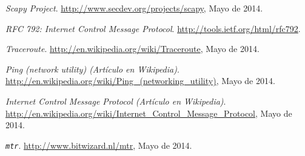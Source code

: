 \documentclass[a4paper, 10pt, twoside]{article}
\begin{document}
\begin{thebibliography}{9}

	\emph{Scapy Project}.
	\url{http://www.secdev.org/projects/scapy}, 
	Mayo de 2014.

  \emph{RFC 792: Internet Control Message Protocol}.
  \url{http://tools.ietf.org/html/rfc792}.

  \emph{Traceroute}.
  \url{http://en.wikipedia.org/wiki/Traceroute},
  Mayo de 2014.

  \emph{Ping (network utility) (Artículo en Wikipedia)}.
  \url{http://en.wikipedia.org/wiki/Ping_(networking_utility)},
  Mayo de 2014.

  \emph{Internet Control Message Protocol (Artículo en Wikipedia)}.
  \url{http://en.wikipedia.org/wiki/Internet_Control_Message_Protocol},
  Mayo de 2014.

  \emph{\texttt{mtr}}.
  \url{http://www.bitwizard.nl/mtr}, 
  Mayo de 2014.

\end{thebibliography}
\end{document}
